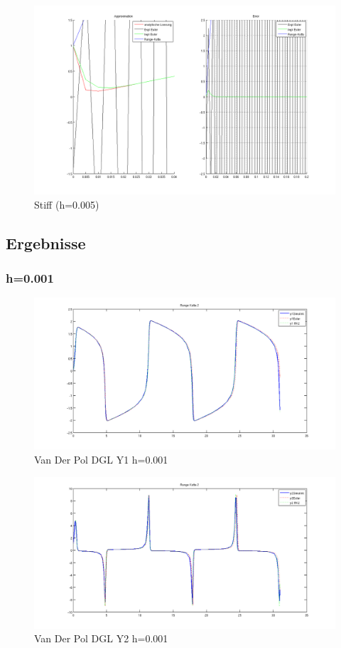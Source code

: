 \documentclass[10pt]{scrartcl}
\begin{document}
	\begin{figure}[H]
			\centering	
			\includegraphics[width=\textwidth]{stiff0005.png}
            \caption{Stiff (h=0.005)}
            \label{pic:stuff005}
		\end{figure} 
	
	
\subsection{Ergebnisse}
	\subsubsection{h=0.001}
		\begin{figure}[H]
			\centering	
			\includegraphics[width=\textwidth]{vanDerPolY10001.png}
            \caption{Van Der Pol DGL Y1 h=0.001}
            \label{pic:y2vdp0001}
		\end{figure} 
		
		\begin{figure}[H]
			\centering	
			\includegraphics[width=\textwidth]{vanDerPolY20001.png}
            \caption{Van Der Pol DGL Y2 h=0.001}
            \label{pic:y2vdp0001}
		\end{figure}		
		
\end{document}

